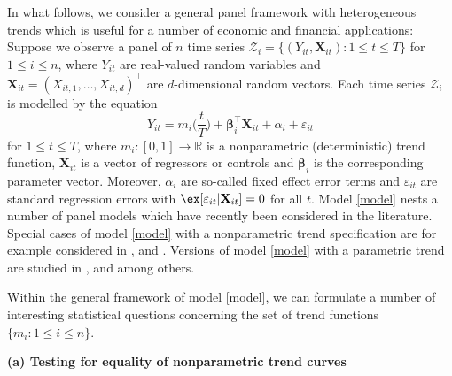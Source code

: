  
In what follows, we consider a general panel framework with heterogeneous trends which is useful for a number of economic and financial applications: Suppose we observe a panel of $n$ time series $\mathcal{Z}_i = \{ (Y_{it},\mathbf{X}_{it}): 1 \le t \le T \}$ for $1 \le i \le n$, where $Y_{it}$ are real-valued random variables and $\mathbf{X}_{it} = (X_{it,1},\ldots,X_{it,d})^\top$ are $d$-dimensional random vectors. Each time series $\mathcal{Z}_i$ is modelled by the equation
\begin{equation}\label{model}
Y_{it} = m_i \Big( \frac{t}{T} \Big) + \bm{\beta}_i^\top \mathbf{X}_{it} + \alpha_i + \varepsilon_{it}
\end{equation}
for $1 \le t \le T$, where $m_i: [0,1] \rightarrow \mathbb{R}$ is a nonparametric (deterministic) trend function, $\mathbf{X}_{it}$ is a vector of regressors or controls and $\bm{\beta}_i$ is the corresponding parameter vector. Moreover, $\alpha_i$ are so-called fixed effect error terms and $\varepsilon_{it}$ are standard regression errors with $\ex[\varepsilon_{it}|\mathbf{X}_{it}] = 0$ for all $t$. Model \eqref{model} nests a number of panel models which have recently been considered in the literature. Special cases of model \eqref{model} with a nonparametric trend specification are for example considered in \cite{Atak2011}, \cite{Zhang2012} and \cite{Hidalgo2014}. Versions of model \eqref{model} with a parametric trend are studied in \cite{Vogelsang2005}, \cite{Sun2011} and \cite{Xu2012} among others.

Within the general framework of model \eqref{model}, we can formulate a number of interesting statistical questions concerning the set of trend functions $\{ m_i:  1 \le i \le n \}$. 

\vspace{10pt}


\noindent \textbf{(a) Testing for equality of nonparametric trend curves} 
\vspace{10pt} 

